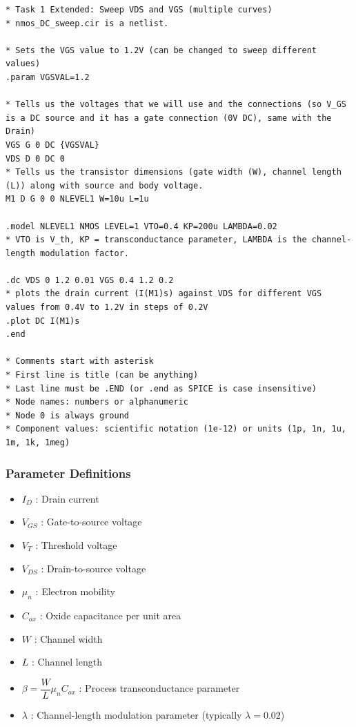 \documentclass[a4paper,12pt]{article}
\begin{document}
\newpage

\begin{lstlisting}[caption=NMOS Sweep Simulation Code, label=lst:nmos_sweep]
* Task 1 Extended: Sweep VDS and VGS (multiple curves)
* nmos_DC_sweep.cir is a netlist.

* Sets the VGS value to 1.2V (can be changed to sweep different values)
.param VGSVAL=1.2 

* Tells us the voltages that we will use and the connections (so V_GS is a DC source and it has a gate connection (0V DC), same with the Drain)
VGS G 0 DC {VGSVAL}
VDS D 0 DC 0
* Tells us the transistor dimensions (gate width (W), channel length (L)) along with source and body voltage.
M1 D G 0 0 NLEVEL1 W=10u L=1u

.model NLEVEL1 NMOS LEVEL=1 VTO=0.4 KP=200u LAMBDA=0.02
* VTO is V_th, KP = transconductance parameter, LAMBDA is the channel-length modulation factor.

.dc VDS 0 1.2 0.01 VGS 0.4 1.2 0.2
* plots the drain current (I(M1)s) against VDS for different VGS values from 0.4V to 1.2V in steps of 0.2V
.plot DC I(M1)s 
.end

* Comments start with asterisk
* First line is title (can be anything)
* Last line must be .END (or .end as SPICE is case insensitive)
* Node names: numbers or alphanumeric
* Node 0 is always ground
* Component values: scientific notation (1e-12) or units (1p, 1n, 1u, 1m, 1k, 1meg)
\end{lstlisting}

\subsubsection*{Parameter Definitions}
\begin{itemize}
    \item $I_D$ : Drain current
    \item $V_{GS}$ : Gate-to-source voltage
    \item $V_T$ : Threshold voltage
    \item $V_{DS}$ : Drain-to-source voltage
    \item $\mu_n$ : Electron mobility
    \item $C_{ox}$ : Oxide capacitance per unit area
    \item $W$ : Channel width
    \item $L$ : Channel length
    \item $\beta = \dfrac{W}{L}\mu_n C_{ox}$ : Process transconductance parameter
    \item $\lambda$ : Channel-length modulation parameter (typically $\lambda = 0.02$)
\end{itemize}
\end{document}
